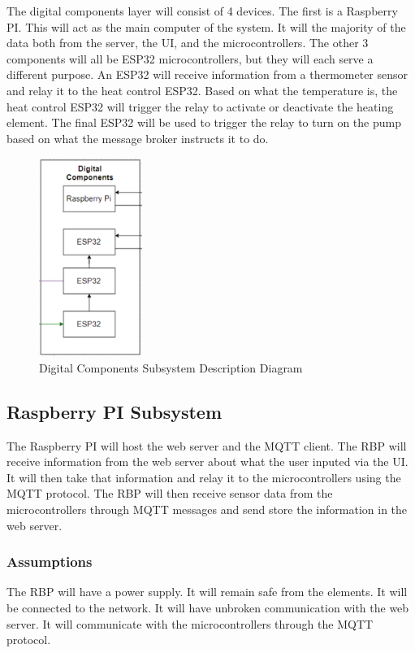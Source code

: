 The digital components layer will consist of 4 devices. The first is a Raspberry
PI. This will act as the main computer of the system. It will the majority of
the data both from the server, the UI, and the microcontrollers. The other 3
components will all be ESP32 microcontrollers, but they will each serve a
different purpose. An ESP32 will receive information from a thermometer sensor
and relay it to the heat control ESP32. Based on what the temperature is, the
heat control ESP32 will trigger the relay to activate or deactivate the heating
element. The final ESP32 will be used to trigger the relay to turn on the pump
based on what the message broker instructs it to do.   

\begin{figure}[h!]
	\centering
 	\includegraphics[width=0.30\textwidth]{images/digital_components.png}
  \caption{Digital Components Subsystem Description Diagram}
\end{figure}

\subsection{Raspberry PI Subsystem}
The Raspberry PI will host the web server and the MQTT client. The RBP will
receive information from the web server about what the user inputed via the UI.
It will then take that information and relay it to the microcontrollers using
the MQTT protocol. The RBP will then receive sensor data from the
microcontrollers through MQTT messages and send store the information in the web
server. 

\subsubsection{Assumptions}
The RBP will have a power supply. It will remain safe from the elements. It
will be connected to the network. It will have unbroken communication with the
web server. It will communicate with the microcontrollers through the MQTT protocol.

